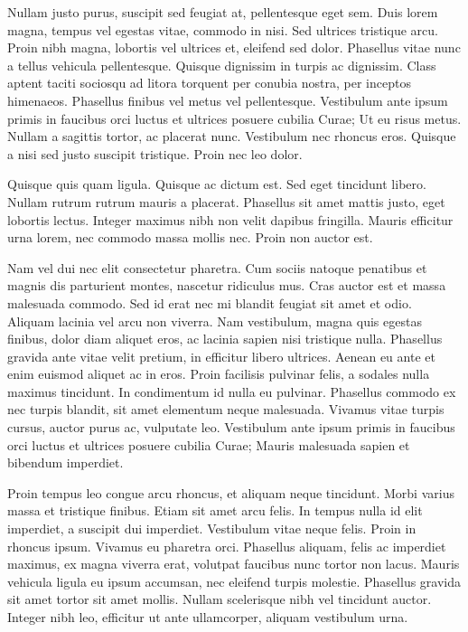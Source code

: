 Nullam justo purus, suscipit sed feugiat at, pellentesque eget sem. Duis lorem magna, tempus vel egestas vitae, commodo in nisi. Sed ultrices tristique arcu. Proin nibh magna, lobortis vel ultrices et, eleifend sed dolor. Phasellus vitae nunc a tellus vehicula pellentesque. Quisque dignissim in turpis ac dignissim. Class aptent taciti sociosqu ad litora torquent per conubia nostra, per inceptos himenaeos. Phasellus finibus vel metus vel pellentesque. Vestibulum ante ipsum primis in faucibus orci luctus et ultrices posuere cubilia Curae; Ut eu risus metus. Nullam a sagittis tortor, ac placerat nunc. Vestibulum nec rhoncus eros. Quisque a nisi sed justo suscipit tristique. Proin nec leo dolor.

Quisque quis quam ligula. Quisque ac dictum est. Sed eget tincidunt libero. Nullam rutrum rutrum mauris a placerat. Phasellus sit amet mattis justo, eget lobortis lectus. Integer maximus nibh non velit dapibus fringilla. Mauris efficitur urna lorem, nec commodo massa mollis nec. Proin non auctor est.

Nam vel dui nec elit consectetur pharetra. Cum sociis natoque penatibus et magnis dis parturient montes, nascetur ridiculus mus. Cras auctor est et massa malesuada commodo. Sed id erat nec mi blandit feugiat sit amet et odio. Aliquam lacinia vel arcu non viverra. Nam vestibulum, magna quis egestas finibus, dolor diam aliquet eros, ac lacinia sapien nisi tristique nulla. Phasellus gravida ante vitae velit pretium, in efficitur libero ultrices. Aenean eu ante et enim euismod aliquet ac in eros. Proin facilisis pulvinar felis, a sodales nulla maximus tincidunt. In condimentum id nulla eu pulvinar. Phasellus commodo ex nec turpis blandit, sit amet elementum neque malesuada. Vivamus vitae turpis cursus, auctor purus ac, vulputate leo. Vestibulum ante ipsum primis in faucibus orci luctus et ultrices posuere cubilia Curae; Mauris malesuada sapien et bibendum imperdiet.

Proin tempus leo congue arcu rhoncus, et aliquam neque tincidunt. Morbi varius massa et tristique finibus. Etiam sit amet arcu felis. In tempus nulla id elit imperdiet, a suscipit dui imperdiet. Vestibulum vitae neque felis. Proin in rhoncus ipsum. Vivamus eu pharetra orci. Phasellus aliquam, felis ac imperdiet maximus, ex magna viverra erat, volutpat faucibus nunc tortor non lacus. Mauris vehicula ligula eu ipsum accumsan, nec eleifend turpis molestie. Phasellus gravida sit amet tortor sit amet mollis. Nullam scelerisque nibh vel tincidunt auctor. Integer nibh leo, efficitur ut ante ullamcorper, aliquam vestibulum urna.

